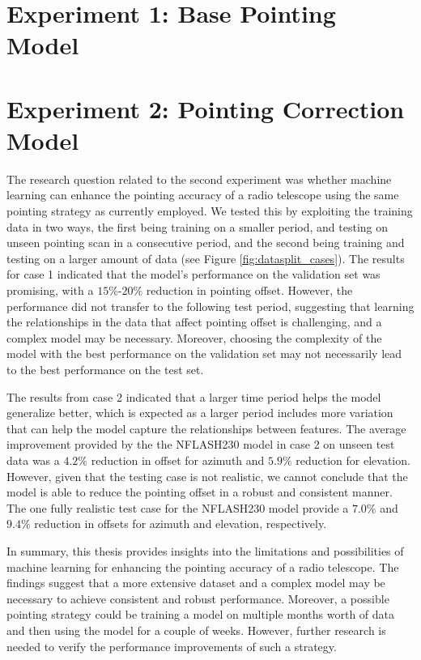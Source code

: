 \section{Experiment 1: Base Pointing Model}
 

\section{Experiment 2: Pointing Correction Model}
The research question related to the second experiment was whether machine learning can enhance the pointing accuracy of a radio telescope using the same pointing strategy as currently employed.
We tested this by exploiting the training data in two ways, the first being training on a smaller period, and testing on unseen pointing scan in a consecutive period,
and the second being training and testing on a larger amount of data (see Figure \ref{fig:datasplit_cases}).
The results for case 1 indicated that the model's performance on the validation set was promising, with a $15\%$-$20\%$ reduction in pointing offset.
However, the performance did not transfer to the following test period, suggesting that learning the relationships in the data that affect pointing offset is challenging, and a complex model may be necessary.
Moreover, choosing the complexity of the model with the best performance on the validation set may not necessarily lead to the best performance on the test set.

The results from case 2 indicated that a larger time period helps the model generalize better,
which is expected as a larger period includes more variation that can help the model capture the relationships between features.
The average improvement provided by the the NFLASH230 model in case 2 on unseen test data was a $4.2\%$ reduction in offset for azimuth and $5.9\%$ reduction for elevation.
However, given that the testing case is not realistic, we cannot conclude that the model is able to reduce the pointing offset in a robust and consistent manner.
The one fully realistic test case for the NFLASH230 model provide a $7.0\%$ and $9.4\%$ reduction in offsets for azimuth and elevation, respectively. 

In summary, this thesis provides insights into the limitations and possibilities of machine learning for enhancing the pointing accuracy of a radio telescope.
The findings suggest that a more extensive dataset and a complex model may be necessary to achieve consistent and robust performance.
Moreover, a possible pointing strategy could be training a model on multiple months worth of data and then using the model for a couple of weeks.
However, further research is needed to verify the performance improvements of such a strategy.

